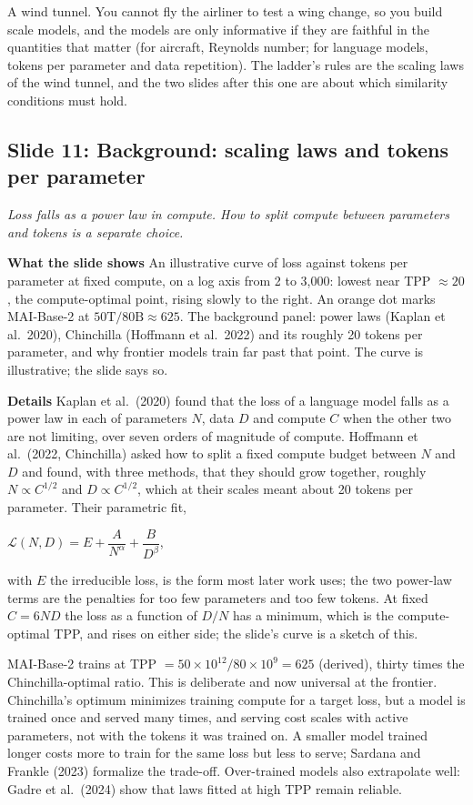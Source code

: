 \documentclass[11pt,letterpaper]{article}
\newcommand{\slide}[3]{%
  \subsection[Slide #1: #2]{Slide #1: #2}%
  {\color{muted}\itshape #3\par}\medskip}
\newcommand{\para}[1]{\medskip\noindent\textbf{#1}\quad}
\newenvironment{intuition}{\begin{tcolorbox}[intuitionbox]}{\end{tcolorbox}}
\newenvironment{formulas}{\begin{tcolorbox}[formulabox]}{\end{tcolorbox}}
\begin{document}
\begin{intuition}
A wind tunnel. You cannot fly the airliner to test a wing change, so you build scale models, and the models are only informative if they are faithful in the quantities that matter (for aircraft, Reynolds number; for language models, tokens per parameter and data repetition). The ladder's rules are the scaling laws of the wind tunnel, and the two slides after this one are about which similarity conditions must hold.
\end{intuition}

\slide{11}{Background: scaling laws and tokens per parameter}{Loss falls as a power law in compute. How to split compute between parameters and tokens is a separate choice.}

\para{What the slide shows} An illustrative curve of loss against tokens per parameter at fixed compute, on a log axis from 2 to 3,000: lowest near TPP $\approx20$, the compute-optimal point, rising slowly to the right. An orange dot marks MAI-Base-2 at $50\text{T}/80\text{B}\approx625$. The background panel: power laws (Kaplan et al.\ 2020), Chinchilla (Hoffmann et al.\ 2022) and its roughly 20 tokens per parameter, and why frontier models train far past that point. The curve is illustrative; the slide says so.

\para{Details} Kaplan et al.\ (2020) found that the loss of a language model falls as a power law in each of parameters $N$, data $D$ and compute $C$ when the other two are not limiting, over seven orders of magnitude of compute. Hoffmann et al.\ (2022, Chinchilla) asked how to split a fixed compute budget between $N$ and $D$ and found, with three methods, that they should grow together, roughly $N\propto C^{1/2}$ and $D\propto C^{1/2}$, which at their scales meant about 20 tokens per parameter. Their parametric fit,
\begin{formulas}
$\mathcal{L}(N,D)=E+\dfrac{A}{N^{\alpha}}+\dfrac{B}{D^{\beta}}$,
\end{formulas}
with $E$ the irreducible loss, is the form most later work uses; the two power-law terms are the penalties for too few parameters and too few tokens. At fixed $C=6ND$ the loss as a function of $D/N$ has a minimum, which is the compute-optimal TPP, and rises on either side; the slide's curve is a sketch of this.

MAI-Base-2 trains at TPP $=50\times10^{12}/80\times10^{9}=625$ (derived), thirty times the Chinchilla-optimal ratio. This is deliberate and now universal at the frontier. Chinchilla's optimum minimizes training compute for a target loss, but a model is trained once and served many times, and serving cost scales with active parameters, not with the tokens it was trained on. A smaller model trained longer costs more to train for the same loss but less to serve; Sardana and Frankle (2023) formalize the trade-off. Over-trained models also extrapolate well: Gadre et al.\ (2024) show that laws fitted at high TPP remain reliable.
\end{document}
